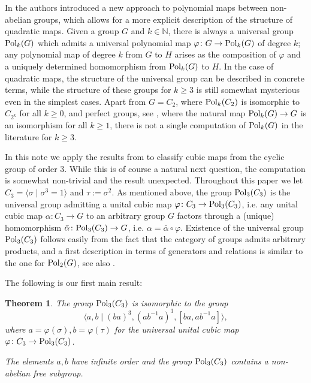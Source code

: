 \documentclass[11pt, a4paper]{amsproc}
\newtheorem{theorem}[thm]{Theorem}
\theoremstyle{remark}
\theoremstyle{plain}
\begin{document}
In \cite{AJ} the authors introduced a new approach to polynomial maps between non-abelian groups, which allows for a more explicit description of the structure of quadratic maps. Given a group $G$ and $k \in \mathbb N$, there is always a universal group ${\rm Pol}_k(G)$ which admits a universal polynomial map $\varphi \colon G \to {\rm Pol}_k(G)$ of degree $k$; any polynomial map of degree $k$ from $G$ to $H$ arises as the composition of $\varphi$ and a uniquely determined homomorphism from ${\rm Pol}_k(G)$ to $H$. In the case of quadratic maps, the structure of the universal group can be described in concrete terms, while the structure of these groups for $k \geq 3$ is still somewhat mysterious even in the simplest cases. Apart from $G=C_2$, where ${\rm Pol}_k(C_2)$ is isomorphic to $C_{2^k}$ for all $k \geq 0$, and perfect groups, see \cite[Corollary 1.5]{AJ}, where the natural map ${\rm Pol}_k(G) \to G$ is an isomorphism for all $k \geq 1$, there is not a single computation of ${\rm Pol}_k(G)$ in the literature for $k \geq 3$.

\medskip

In this note we apply the results from \cite{AJ} to classify cubic maps from the cyclic group of order $3$.  While this is of course a natural next question, the computation is somewhat non-trivial and the result unexpected. Throughout this paper we let $C_3=\langle \sigma\mid \sigma^3=1\rangle$ and $\tau:=\sigma^2$. As mentioned above, the group ${\rm Pol}_3(C_3)$ is the universal group admitting a unital cubic map $\varphi \colon C_3 \to {\rm Pol}_3(C_3)$, i.e. any unital cubic map $\alpha \colon C_3 \to G$ to an arbitrary group $G$ factors through a (unique) homomorphism $\bar \alpha \colon {\rm Pol}_3(C_3)\to G$, i.e. $\alpha = \bar \alpha \circ \varphi$.
Existence of the universal group ${\rm Pol}_3(C_3)$ follows easily from the fact that the category of groups admits arbitrary products, and a first description in terms of generators and relations is similar to the one for ${\rm Pol}_2(G)$, see also \cite[Remark 2.5]{AJ}.

\medskip

The following is our first main result:

\begin{theorem} \label{main}
The group ${\rm Pol}_3(C_3)$ is isomorphic to the group
$$\langle a,b \mid (ba)^3, (ab^{-1}a)^3, [ba,ab^{-1}a] \rangle,$$ where $a = \varphi(\sigma), b=\varphi(\tau)$ for the universal unital cubic map $\varphi \colon C_3 \to {\rm Pol}_3(C_3)$. 

The elements $a,b$ have infinite order and the group ${\rm Pol}_3(C_3)$ contains a non-abelian free subgroup.
\end{theorem}
\end{document}
